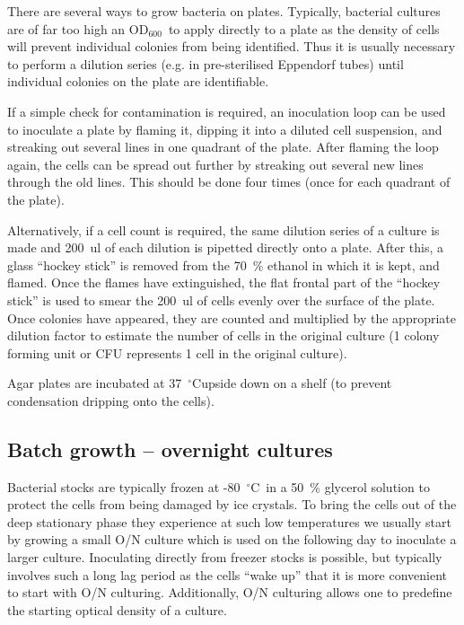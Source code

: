 \documentclass[a4paper]{article}
\newcommand{\dc}{~$^{\circ}$C}
\newcommand{\od}{OD$_{600}$}
\begin{document}
\begin{multicols}{2}
There are several ways to grow bacteria on plates. Typically, bacterial
cultures are of far too high an \od\ to apply directly to a plate as the
density of cells will prevent individual colonies from being identified. Thus
it is usually necessary to perform a dilution series (e.g. in pre-sterilised
Eppendorf tubes) until individual colonies on the plate are identifiable.

If a simple check for contamination is required, an inoculation loop can be
used to inoculate a plate by flaming it, dipping it into a diluted cell
suspension, and streaking out several lines in one quadrant of the plate. After
flaming the loop again, the cells can be spread out further by streaking out
several new lines through the old lines. This should be done four times (once
for each quadrant of the plate).

Alternatively, if a cell count is required, the same dilution series of a
culture is made and 200~ul of each dilution is pipetted directly onto a plate.
After this, a glass ``hockey stick'' is removed from the 70~\% ethanol in which
it is kept, and flamed. Once the flames have extinguished, the flat frontal
part of the ``hockey stick'' is used to smear the 200~ul of cells evenly over
the surface of the plate. Once colonies have appeared, they are counted and
multiplied by the appropriate dilution factor to estimate the number of cells
in the original culture (1 colony forming unit or CFU represents 1 cell in the
original culture).

Agar plates are incubated at 37\dc upside down on a shelf (to prevent
condensation dripping onto the cells).


\subsection{Batch growth -- overnight cultures} 

Bacterial stocks are typically frozen at -80\dc\ in a 50~\% glycerol solution
to protect the cells from being damaged by ice crystals. To bring the cells out
of the deep stationary phase they experience at such low temperatures we
usually start by growing a small O/N culture which is used on the following day
to inoculate a larger culture. Inoculating directly from freezer stocks is
possible, but typically involves such a long lag period as the cells ``wake
up'' that it is more convenient to start with O/N culturing. Additionally, O/N
culturing allows one to predefine the starting optical density of a culture.


\end{multicols}
\end{document}
